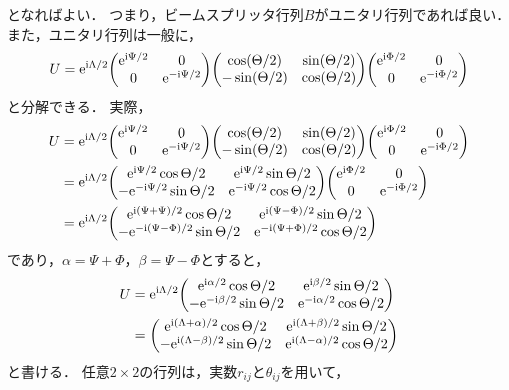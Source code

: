 \documentclass{report}
\begin{document}
    となればよい．
    つまり，ビームスプリッタ行列$B$がユニタリ行列であれば良い．
    また，ユニタリ行列は一般に，
    \begin{align}
      U = \e^{\i\Lambda/2}
      \mqty(
        \e^{\i\Psi/2} & 0 \\ 
        0 & \e^{-\i\Psi/2}
      )
      \mqty(
        \cos(\Theta/2) & \sin(\Theta/2) \\ 
        -\sin(\Theta/2) & \cos(\Theta/2)
      )\mqty(
        \e^{\i\Phi/2} & 0 \\ 
        0 & \e^{-\i\Phi/2}
      )
    \end{align}
    と分解できる．
    実際，
    \begin{align}
      U &= \e^{\i\Lambda/2}
      \mqty(
        \e^{\i\Psi/2} & 0 \\ 
        0 & \e^{-\i\Psi/2}
      )
      \mqty(
        \cos(\Theta/2) & \sin(\Theta/2) \\ 
        -\sin(\Theta/2) & \cos(\Theta/2)
      )\mqty(
        \e^{\i\Phi/2} & 0 \\ 
        0 & \e^{-\i\Phi/2}
      ) \\ 
      &= \e^{\i\Lambda/2}\mqty(
        \e^{\i\Psi/2}\cos\Theta/2 & \e^{\i\Psi/2}\sin\Theta/2 \\ 
        -\e^{-\i\Psi/2}\sin\Theta/2 & \e^{-\i\Psi/2}\cos\Theta/2
      )\mqty(
        \e^{\i\Phi/2} & 0 \\ 
        0 & \e^{-\i\Phi/2}
      ) \\ 
      &= \e^{\i\Lambda/2}\mqty(
        \e^{\i(\Psi + \Psi) / 2}\cos\Theta/2 & \e^{\i(\Psi - \Phi) / 2}\sin\Theta/2 \\ 
        -\e^{-\i(\Psi - \Phi) / 2}\sin\Theta/2 & \e^{-\i(\Psi + \Phi) / 2}\cos\Theta/2
      )\label{unitary-representation}
    \end{align}
    であり，$\alpha = \Psi + \Phi$，$\beta = \Psi - \Phi$とすると，
    \begin{align}
      U &= \e^{\i\Lambda/2}\mqty(
        \e^{\i\alpha / 2}\cos\Theta/2 & \e^{\i\beta / 2}\sin\Theta/2 \\ 
        -\e^{-\i\beta / 2}\sin\Theta/2 & \e^{-\i\alpha / 2}\cos\Theta/2
      ) \\ 
      &= \mqty(
        \e^{\i(\Lambda + \alpha) / 2}\cos\Theta/2 & \e^{\i(\Lambda + \beta) / 2}\sin\Theta/2 \\ 
        -\e^{\i(\Lambda - \beta) / 2}\sin\Theta/2 & \e^{\i(\Lambda - \alpha) / 2}\cos\Theta/2
      ) 
    \end{align}
    と書ける．
    任意$2\times 2$の行列は，実数$r_{ij}$と$\theta_{ij}$を用いて，
\end{document}
